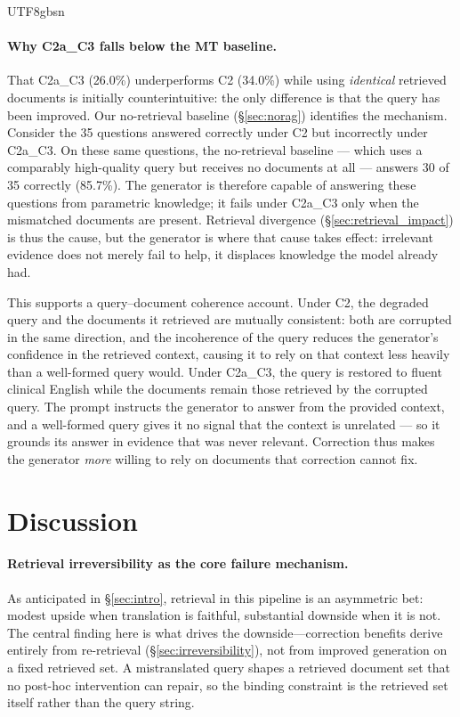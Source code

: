 \documentclass[11pt]{article}
\begin{document}
\begin{CJK}{UTF8}{gbsn}
\paragraph{Why C2a\_C3 falls below the MT baseline.}
That C2a\_C3 (26.0\%) underperforms C2 (34.0\%) while using \emph{identical} retrieved documents is initially counterintuitive: the only difference is that the query has been improved. Our no-retrieval baseline (\S\ref{sec:norag}) identifies the mechanism. Consider the 35 questions answered correctly under C2 but incorrectly under C2a\_C3. On these same questions, the no-retrieval baseline --- which uses a comparably high-quality query but receives no documents at all --- answers 30 of 35 correctly (85.7\%). The generator is therefore capable of answering these questions from parametric knowledge; it fails under C2a\_C3 only when the mismatched documents are present. Retrieval divergence (\S\ref{sec:retrieval_impact}) is thus the cause, but the generator is where that cause takes effect: irrelevant evidence does not merely fail to help, it displaces knowledge the model already had.

This supports a query--document coherence account. Under C2, the degraded query and the documents it retrieved are mutually consistent: both are corrupted in the same direction, and the incoherence of the query reduces the generator's confidence in the retrieved context, causing it to rely on that context less heavily than a well-formed query would. Under C2a\_C3, the query is restored to fluent clinical English while the documents remain those retrieved by the corrupted query. The prompt instructs the generator to answer from the provided context, and a well-formed query gives it no signal that the context is unrelated --- so it grounds its answer in evidence that was never relevant. Correction thus makes the generator \emph{more} willing to rely on documents that correction cannot fix.

\section{Discussion}
\label{sec:discussion}
\paragraph{Retrieval irreversibility as the core failure mechanism.}
As anticipated in \S\ref{sec:intro}, retrieval in this pipeline is an asymmetric bet: modest upside when translation is faithful, substantial downside when it is not. The central finding here is what drives the downside---correction benefits derive entirely from re-retrieval (\S\ref{sec:irreversibility}), not from improved generation on a fixed retrieved set. A mistranslated query shapes a retrieved document set that no post-hoc intervention can repair, so the binding constraint is the retrieved set itself rather than the query string.


\end{CJK}
\end{document}

